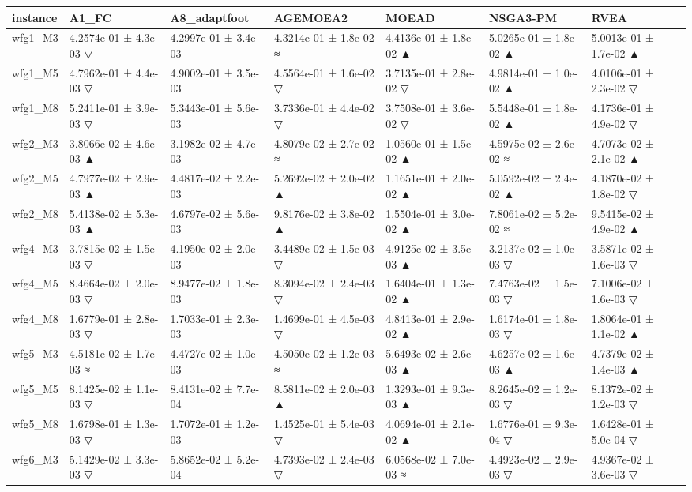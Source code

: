 \begin{tabular}{lllllll}
\toprule
instance & A1\_FC & A8\_adaptfoot & AGEMOEA2 & MOEAD & NSGA3-PM & RVEA \\
\midrule
wfg1\_M3 & 4.2574e-01 ± 4.3e-03 ▽ & 4.2997e-01 ± 3.4e-03 & 4.3214e-01 ± 1.8e-02 ≈ & 4.4136e-01 ± 1.8e-02 ▲ & 5.0265e-01 ± 1.8e-02 ▲ & 5.0013e-01 ± 1.7e-02 ▲ \\
wfg1\_M5 & 4.7962e-01 ± 4.4e-03 ▽ & 4.9002e-01 ± 3.5e-03 & 4.5564e-01 ± 1.6e-02 ▽ & 3.7135e-01 ± 2.8e-02 ▽ & 4.9814e-01 ± 1.0e-02 ▲ & 4.0106e-01 ± 2.3e-02 ▽ \\
wfg1\_M8 & 5.2411e-01 ± 3.9e-03 ▽ & 5.3443e-01 ± 5.6e-03 & 3.7336e-01 ± 4.4e-02 ▽ & 3.7508e-01 ± 3.6e-02 ▽ & 5.5448e-01 ± 1.8e-02 ▲ & 4.1736e-01 ± 4.9e-02 ▽ \\
wfg2\_M3 & 3.8066e-02 ± 4.6e-03 ▲ & 3.1982e-02 ± 4.7e-03 & 4.8079e-02 ± 2.7e-02 ≈ & 1.0560e-01 ± 1.5e-02 ▲ & 4.5975e-02 ± 2.6e-02 ≈ & 4.7073e-02 ± 2.1e-02 ▲ \\
wfg2\_M5 & 4.7977e-02 ± 2.9e-03 ▲ & 4.4817e-02 ± 2.2e-03 & 5.2692e-02 ± 2.0e-02 ▲ & 1.1651e-01 ± 2.0e-02 ▲ & 5.0592e-02 ± 2.4e-02 ▲ & 4.1870e-02 ± 1.8e-02 ▽ \\
wfg2\_M8 & 5.4138e-02 ± 5.3e-03 ▲ & 4.6797e-02 ± 5.6e-03 & 9.8176e-02 ± 3.8e-02 ▲ & 1.5504e-01 ± 3.0e-02 ▲ & 7.8061e-02 ± 5.2e-02 ≈ & 9.5415e-02 ± 4.9e-02 ▲ \\
wfg4\_M3 & 3.7815e-02 ± 1.5e-03 ▽ & 4.1950e-02 ± 2.0e-03 & 3.4489e-02 ± 1.5e-03 ▽ & 4.9125e-02 ± 3.5e-03 ▲ & 3.2137e-02 ± 1.0e-03 ▽ & 3.5871e-02 ± 1.6e-03 ▽ \\
wfg4\_M5 & 8.4664e-02 ± 2.0e-03 ▽ & 8.9477e-02 ± 1.8e-03 & 8.3094e-02 ± 2.4e-03 ▽ & 1.6404e-01 ± 1.3e-02 ▲ & 7.4763e-02 ± 1.5e-03 ▽ & 7.1006e-02 ± 1.6e-03 ▽ \\
wfg4\_M8 & 1.6779e-01 ± 2.8e-03 ▽ & 1.7033e-01 ± 2.3e-03 & 1.4699e-01 ± 4.5e-03 ▽ & 4.8413e-01 ± 2.9e-02 ▲ & 1.6174e-01 ± 1.8e-03 ▽ & 1.8064e-01 ± 1.1e-02 ▲ \\
wfg5\_M3 & 4.5181e-02 ± 1.7e-03 ≈ & 4.4727e-02 ± 1.0e-03 & 4.5050e-02 ± 1.2e-03 ≈ & 5.6493e-02 ± 2.6e-03 ▲ & 4.6257e-02 ± 1.6e-03 ▲ & 4.7379e-02 ± 1.4e-03 ▲ \\
wfg5\_M5 & 8.1425e-02 ± 1.1e-03 ▽ & 8.4131e-02 ± 7.7e-04 & 8.5811e-02 ± 2.0e-03 ▲ & 1.3293e-01 ± 9.3e-03 ▲ & 8.2645e-02 ± 1.2e-03 ▽ & 8.1372e-02 ± 1.2e-03 ▽ \\
wfg5\_M8 & 1.6798e-01 ± 1.3e-03 ▽ & 1.7072e-01 ± 1.2e-03 & 1.4525e-01 ± 5.4e-03 ▽ & 4.0694e-01 ± 2.1e-02 ▲ & 1.6776e-01 ± 9.3e-04 ▽ & 1.6428e-01 ± 5.0e-04 ▽ \\
wfg6\_M3 & 5.1429e-02 ± 3.3e-03 ▽ & 5.8652e-02 ± 5.2e-04 & 4.7393e-02 ± 2.4e-03 ▽ & 6.0568e-02 ± 7.0e-03 ≈ & 4.4923e-02 ± 2.9e-03 ▽ & 4.9367e-02 ± 3.6e-03 ▽ \\

\end{tabular}
